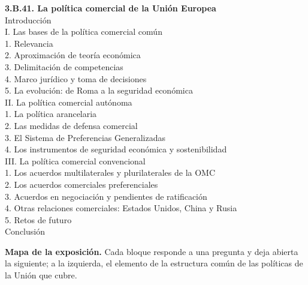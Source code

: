\documentclass[11pt]{article}
\begin{document}
\begin{esquema}[unbreakable]
\textbf{3.B.41. La política comercial de la Unión Europea}\\[2pt]
Introducción\\
I. Las bases de la política comercial común\\
\hspace*{1.5em}1. Relevancia\\
\hspace*{1.5em}2. Aproximación de teoría económica\\
\hspace*{1.5em}3. Delimitación de competencias\\
\hspace*{1.5em}4. Marco jurídico y toma de decisiones\\
\hspace*{1.5em}5. La evolución: de Roma a la seguridad económica\\
II. La política comercial autónoma\\
\hspace*{1.5em}1. La política arancelaria\\
\hspace*{1.5em}2. Las medidas de defensa comercial\\
\hspace*{1.5em}3. El Sistema de Preferencias Generalizadas\\
\hspace*{1.5em}4. Los instrumentos de seguridad económica y sostenibilidad\\
III. La política comercial convencional\\
\hspace*{1.5em}1. Los acuerdos multilaterales y plurilaterales de la OMC\\
\hspace*{1.5em}2. Los acuerdos comerciales preferenciales\\
\hspace*{1.5em}3. Acuerdos en negociación y pendientes de ratificación\\
\hspace*{1.5em}4. Otras relaciones comerciales: Estados Unidos, China y Rusia\\
\hspace*{1.5em}5. Retos de futuro\\
Conclusión
\end{esquema}

\begin{anotaciones}
\textbf{Mapa de la exposición.} Cada bloque responde a una pregunta y deja abierta la siguiente; a la izquierda, el elemento de la estructura común de las políticas de la Unión que cubre.
\begin{infografiacaja}
\caption{Mapa de la exposición: la pregunta de cada bloque y el hilo que los une}\label{figu:mapa-tema}
\end{infografiacaja}
\end{anotaciones}
\end{document}
